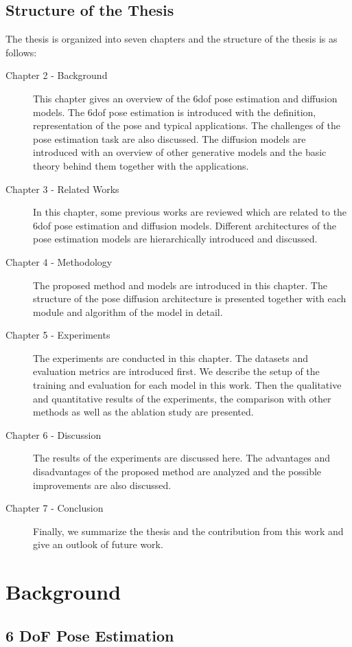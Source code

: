 \documentclass[12pt,DIV14,BCOR12mm,a4paper,footinclude=false,headinclude,parskip=half-,twoside,openright,cleardoublepage=empty,toc=index,bibliography=totoc,listof=totoc]{scrreprt}
\numberwithin{equation}{chapter}
\begin{document}
\section{Structure of the Thesis}
The thesis is organized into seven chapters and the structure of the thesis is as follows:
\begin{description}
  \item[Chapter 2 - Background] This chapter gives an overview of the \gls{6dof} pose estimation and diffusion models. The \gls{6dof} pose estimation is introduced with the definition, representation of the pose and typical applications. The challenges of the pose estimation task are also discussed. The diffusion models are introduced with an overview of other generative models and the basic theory behind them together with the applications.
  \item[Chapter 3 - Related Works] In this chapter, some previous works are reviewed which are related to the \gls{6dof} pose estimation and diffusion models. Different architectures of the pose estimation models are hierarchically introduced and discussed.
  \item[Chapter 4 - Methodology] The proposed method and models are introduced in this chapter. The structure of the pose diffusion architecture is presented together with each module and algorithm of the model in detail.
  \item[Chapter 5 - Experiments] The experiments are conducted in this chapter. The datasets and evaluation metrics are introduced first. We describe the setup of the training and evaluation for each model in this work. Then the qualitative and quantitative results of the experiments, the comparison with other methods as well as the ablation study are presented.
  \item[Chapter 6 - Discussion] The results of the experiments are discussed here. The advantages and disadvantages of the proposed method are analyzed and the possible improvements are also discussed.
  \item[Chapter 7 - Conclusion ] Finally, we summarize the thesis and the contribution from this work and give an outlook of future work.
\end{description} 

\chapter{Background}
\section{6 DoF Pose Estimation}
\end{document}
